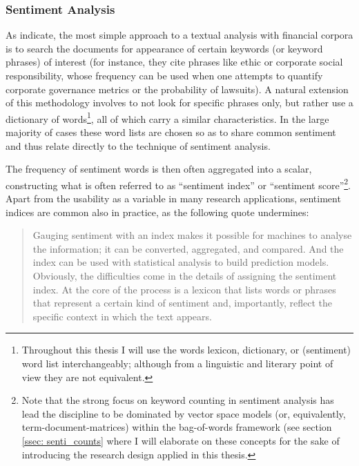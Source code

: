 
\subsubsection{Sentiment Analysis}
\label{sssec: lit_rev_mining_senti}

As \textcite{LM-meta-2016} indicate, the most simple approach to a textual analysis with financial corpora is to search the documents for appearance of certain keywords (or keyword phrases) of interest (for instance, they cite phrases like \textsf{ethic} or \textsf{corporate social responsibility}, whose frequency can be used when one attempts to quantify corporate governance metrics or the probability of lawsuits). A natural extension of this methodology involves to not look for specific phrases only, but rather use a dictionary of words\footnote{Throughout this thesis I will use the words lexicon, dictionary, or (sentiment) word list interchangeably; although from a linguistic and literary point of view they are not equivalent.}, all of which carry a similar characteristics. In the large majority of cases these word lists are chosen so as to share common sentiment and thus relate directly to the technique of sentiment analysis. 

The frequency of sentiment words is then often aggregated into a scalar, constructing what is often referred to as \enquote{sentiment index} or \enquote{sentiment score}\footnote{Note that the strong focus on keyword counting in sentiment analysis has lead the discipline to be dominated by vector space models (or, equivalently, term-document-matrices) within the bag-of-words framework (see section \ref{ssec: senti_counts} where I will elaborate on these concepts for the sake of introducing the research design applied in this thesis.}. Apart from the usability as a variable in many research applications, sentiment indices are common also in practice, as the following quote undermines:
\blockquote[\textcite{McKinsey_2013}]{Gauging sentiment with an index makes it possible for machines to analyse the information; it can be converted, aggregated, and compared. And the index can be used with statistical analysis to build prediction models. Obviously, the difficulties come in the details of assigning the sentiment index. At the core of the process is a lexicon that lists words or phrases that represent a certain kind of sentiment and, importantly, reflect the specific context in which the text appears.}

